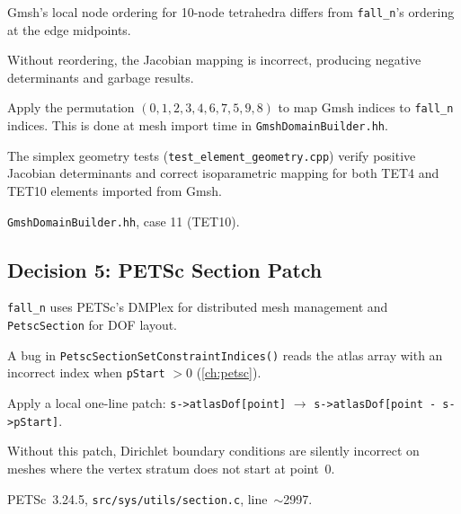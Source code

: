 \begin{description}[leftmargin=0pt,style=nextline]
  \item[Context] Gmsh's local node ordering for 10-node tetrahedra differs
    from \texttt{fall\_n}'s ordering at the edge midpoints.

  \item[Problem] Without reordering, the Jacobian mapping is incorrect,
    producing negative determinants and garbage results.

  \item[Decision] Apply the permutation $(0,1,2,3,4,6,7,5,9,8)$ to map Gmsh
    indices to \texttt{fall\_n} indices.  This is done at mesh import time in
    \texttt{GmshDomainBuilder.hh}.

  \item[Verification] The simplex geometry tests
    (\texttt{test\_element\_geometry.cpp}) verify positive Jacobian
    determinants and correct isoparametric mapping for both TET4 and TET10
    elements imported from Gmsh.

  \item[Source] \texttt{GmshDomainBuilder.hh}, case 11 (TET10).
\end{description}


\subsection{Decision 5: PETSc Section Patch}
\label{sec:dec_petsc}

\begin{description}[leftmargin=0pt,style=nextline]
  \item[Context] \texttt{fall\_n} uses PETSc's DMPlex for distributed mesh
    management and \texttt{PetscSection} for DOF layout.

  \item[Problem] A bug in \texttt{PetscSectionSetConstraintIndices()} reads
    the atlas array with an incorrect index when \texttt{pStart} $> 0$
    (\cref{ch:petsc}).

  \item[Decision] Apply a local one-line patch:
    \texttt{s->atlasDof[point]} $\to$
    \texttt{s->atlasDof[point - s->pStart]}.

  \item[Impact] Without this patch, Dirichlet boundary conditions are silently
    incorrect on meshes where the vertex stratum does not start at point~0.

  \item[Source] PETSc~3.24.5, \texttt{src/sys/utils/section.c}, line~$\sim$2997.
\end{description}


